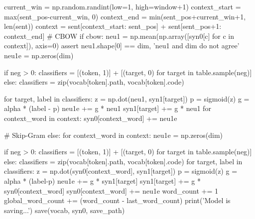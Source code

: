 \begin{python}
            current_win = np.random.randint(low=1, high=window+1)
            context_start = max(sent_pos-current_win, 0)
            context_end = min(sent_pos+current_win+1, len(sent))
            context = sent[context_start: sent_pos] + sent[sent_pos+1: context_end]
            # CBOW
            if cbow:
                neu1 = np.mean(np.array([syn0[c] for c in context]), axis=0)
                assert neu1.shape[0] == dim, 'neu1 and dim do not agree'
                neu1e = np.zeros(dim)

                if neg > 0:
                    classifiers = [(token, 1)] + [(target, 0) for target in table.sample(neg)]
                else:
                    classifiers = zip(vocab[token].path, vocab[token].code)

                for target, label in classifiers:
                    z = np.dot(neu1, syn1[target])
                    p = sigmoid(z)
                    g = alpha * (label - p)
                    neu1e += g * neu1
                    syn1[target] += g * neu1
                for context_word in context:
                    syn0[context_word] += neu1e

            # Skip-Gram
            else:
                for context_word in context:
                    neu1e = np.zeros(dim)

                    if neg > 0:
                        classifiers = [(token, 1)] + [(target, 0) for target in table.sample(neg)]
                    else:
                        classifiers = zip(vocab[token].path, vocab[token].code)
                    for target, label in classifiers:
                        z = np.dot(syn0[context_word], syn1[target])
                        p = sigmoid(z)
                        g = alpha * (label-p)
                        neu1e += g * syn1[target]
                        syn1[target] += g * syn0[context_word]
                    syn0[context_word] += neu1e
            word_count += 1
        global_word_count += (word_count - last_word_count)
    print('Model is saving...')
    save(vocab, syn0, save_path)
\end{python}
